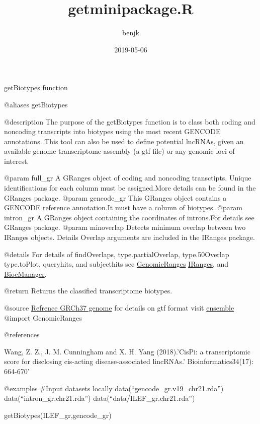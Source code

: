 \documentclass[]{article}
\title{getminipackage.R}
\author{benjk}
\date{2019-05-06}
\begin{document}
\maketitle

getBiotypes function

@aliases getBiotypes

@description The purpose of the getBiotypes function is to class both
coding and noncoding transcripts into biotypes using the most recent
GENCODE annotations. This tool can also be used to define potential
lncRNAs, given an available genome transcriptome assembly (a gtf file)
or any genomic loci of interest.

@param full\_gr A GRanges object of coding and noncoding transctipts.
Unique identifications for each column must be assigned.More details can
be found in the GRanges package. @param gencode\_gr This GRanges object
contains a GENCODE reference annotation.It must have a column of
biotypes. @param intron\_gr A GRanges object containing the coordinates
of introns.For details see GRanges package. @param minoverlap Detects
minimum overlap between two IRanges objects. Details Overlap arguments
are included in the IRanges package.

@details For details of findOverlaps, type.partialOverlap,
type.50Overlap type.toPlot, queryhits, and subjecthits see
\href{https://www.bioconductor.org/packages/release/bioc/html/GenomicRanges.html}{GenomicRanges}
\href{https://www.bioconductor.org/packages/release/bioc/html/IRanges.html}{IRanges},
and \href{http://bioconductor.org/install/index.html}{BiocManager}.

@return Returns the classified transcriptome biotypes.

@source
\href{https://www.gencodegenes.org/human/release_25lift37.html}{Refrence
GRCh37 genome} for details on gtf format visit
\href{https://useast.ensembl.org/info/website/upload/gff.html}{ensemble}
@import GenomicRanges

@references

Wang, Z. Z., J. M. Cunningham and X. H. Yang (2018).'CisPi: a
transcriptomic score for disclosing cis-acting disease-associated
lincRNAs.' Bioinformatics34(17): 664-670'

@examples \#Input datasets locally data(``gencode\_gr.v19\_chr21.rda'')
data(``intron\_gr.chr21.rda'') data(``data/ILEF\_gr.chr21.rda'')

getBiotypes(ILEF\_gr,gencode\_gr)

\end{document}
